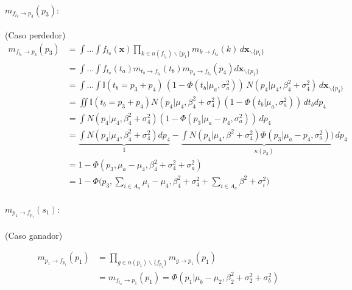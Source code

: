 \documentclass[11pt,twoside,spanish]{report} %
\begin{document}
\paragraph{$m_{f_{t_b} \rightarrow p_3}(p_3):$} (Caso perdedor)
\begin{equation}
	\begin{split}
		m_{f_{t_b} \rightarrow p_3}(p_3)&= \int \dots \int f_{t_a}(\textbf{x}) \prod_{k \in n(f_{t_a}) \backslash \{p_1\} } m_{k \rightarrow f_{t_a}}(k) \, d\textbf{x}_{\backslash \{p_1\} }  \\
		&= \int \dots \int f_{t_a}(t_a) m_{t_b\rightarrow f_{t_b}}(t_b) m_{p_4 \rightarrow f_{t_b}}(p_4)d\textbf{x}_{\backslash \{p_1\} }  \\
		&= \int \dots \int \mathbb{I}( t_b = p_3 + p_4) \, (1-\Phi (t_b| \mu_a , \sigma_a^2 )) \, N(p_4| \mu_4, \beta_4^2 + \sigma_4^2 ) \, d\textbf{x}_{\backslash \{p_3\} }\\
		&= \iint \mathbb{I}( t_b = p_3 + p_4) N(p_4| \mu_4, \beta_4^2 + \sigma_4^2 )  (1 - \Phi (t_b| \mu_a , \sigma_a^2) )\, dt_b dp_4 \\
		&=\int N(p_4| \mu_4, \beta_4^2 + \sigma_4^2 )  (1 - \Phi (p_3 | \mu_a - p_4 , \sigma_a^2 ) ) \,  dp_4 \\
		& =  \underbrace{\int N(p_4| \mu_4, \beta_4^2 + \sigma_4^2 )dp_4}_{1}  -  \underbrace{\int N(p_4| \mu_4, \beta^2 + \sigma_4^2 ) \Phi (p_3 | \mu_a - p_4 , \sigma_a^2 ) ) \, dp_4}_{\kappa(p_3)} \\
		& = 1 - \Phi(p_3, \mu_a  - \mu_4, \beta_4^2 + \sigma_4^2 + \sigma_a^2)\\[0.1cm]
		&=1 - \Phi\Big(p_3, \sum_{i \in A_a} \mu_i  - \mu_4, \beta_4^2 + \sigma_4^2 + \sum_{i \in A_a} \beta^2 + \sigma_i^2  \Big)
	\end{split}
\end{equation}


\paragraph{$m_{p_1 \rightarrow f_{p_1}}(s_1):$} (Caso ganador)

\begin{equation}
	\begin{split}
		m_{p_1 \rightarrow f_{p_1}}(p_1) &= \prod_{g \in n(p_1) \backslash  \{f_{p_1} \}} m_{g \rightarrow p_1} (p_1) \\
		&=m_{f_{t_a} \rightarrow p_1}(p_1) =  \Phi(p_1| \mu_b - \mu_2, \beta_2^2 + \sigma_2^2 + \sigma_b^2)
	\end{split}
\end{equation}
\end{document}

